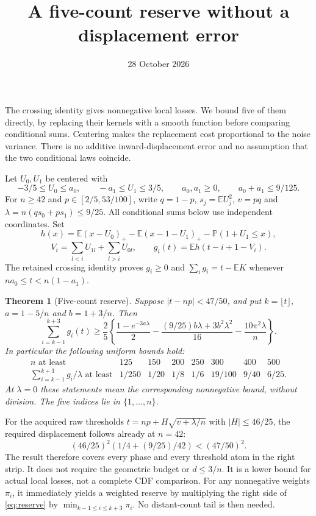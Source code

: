 \documentclass[11pt]{article}
\title{A five-count reserve without a displacement error}
\author{}\date{28 October 2026}
\newcommand{\E}{\mathbb E}\newcommand{\Pp}{\mathbb P}
\newtheorem{theorem}{Theorem}\newtheorem{lemma}[theorem]{Lemma}
\begin{document}
\maketitle

The crossing identity gives nonnegative local losses. We bound five of
them directly, by replacing their kernels with a smooth function before
comparing conditional sums. Centering makes the replacement cost
proportional to the noise variance. There is no additive inward-displacement
error and no assumption that the two conditional laws coincide.

Let $U_0,U_1$ be centered with
\[
 -3/5\le U_0\le a_0,\qquad -a_1\le U_1\le3/5,\qquad
 a_0,a_1\ge0,\qquad a_0+a_1\le9/125.
\]
For $n\ge42$ and $p\in[2/5,53/100]$, write $q=1-p$,
$s_j=\E U_j^2$, $v=pq$ and $\lambda=n(qs_0+ps_1)\le9/25$.
All conditional sums below use independent coordinates. Set
\[
 h(x)=\E(x-U_0)_+-\E(x-1-U_1)_+-\Pp(1+U_1\le x),
\]
\[
 V_i=\sum_{l<i}U_{1l}+\sum_{l>i}U_{0l},\qquad
 g_i(t)=\E h(t-i+1-V_i).
\]
The retained crossing identity proves $g_i\ge0$ and
$\sum_i g_i=t-\E K$ whenever $na_0\le t<n(1-a_1)$.

\begin{theorem}[Five-count reserve]\label{thm:main}
Suppose $|t-np|<47/50$, and put $k=\lfloor t\rfloor$,
$a=1-5/n$ and $b=1+3/n$. Then
\begin{equation}\label{eq:reserve}
\sum_{i=k-1}^{k+3}g_i(t)\ge
\frac25\left\{\frac{1-e^{-3a\lambda}}2
-\frac{(9/25)b\lambda+3b^2\lambda^2}{16}
-\frac{10\pi^2\lambda}{n}\right\}.
\end{equation}
In particular the following uniform bounds hold:
\[
\begin{array}{c|rrrrrrr}
 n\text{ at least}&125&150&200&250&300&400&500\\ \hline
 \sum_{i=k-1}^{k+3}g_i/\lambda\text{ at least}
 &1/250&1/20&1/8&1/6&19/100&9/40&6/25 .
\end{array}
\]
At $\lambda=0$ these statements mean the corresponding nonnegative bound,
without division. The five indices lie in $\{1,\ldots,n\}$.
\end{theorem}

For the acquired raw thresholds $t=np+H\sqrt{v+\lambda/n}$ with
$|H|\le46/25$, the required displacement follows already at $n=42$:
\[
(46/25)^2(1/4+(9/25)/42)<(47/50)^2.
\]
The result therefore covers every phase and every threshold atom in the
right strip. It does not require the geometric budget or $d\le3/n$.
It is a lower bound for actual local losses, not a complete CDF comparison.
For any nonnegative weights $\pi_i$, it immediately yields a weighted
reserve by multiplying the right side of \eqref{eq:reserve} by
$\min_{k-1\le i\le k+3}\pi_i$. No distant-count tail is then needed.
\end{document}
